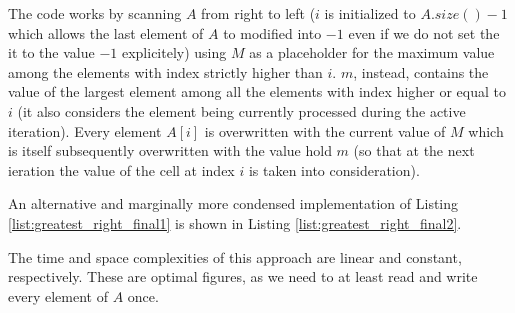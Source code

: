 

The code works by scanning $A$ from right to left ($i$ is initialized to $A.size()-1$ which allows the last element of $A$ to modified into $-1$ even if we do not set the it to the value $-1$ explicitely) using $M$ as a placeholder for the maximum value among the elements with index strictly higher than $i$. 
$m$, instead, contains the value of the largest element among all the elements with index higher or equal to $i$ (it also considers the element being currently processed during the active iteration). 
Every element $A[i]$ is overwritten with the current value of $M$ which is itself subsequently overwritten with the value hold $m$ (so that at the next ieration the value of the cell at index $i$ is taken into consideration).

An alternative and marginally more condensed implementation of Listing \ref{list:greatest_right_final1} is shown in Listing \ref{list:greatest_right_final2}.



The time and space complexities of this approach are linear and constant, respectively. These are optimal figures, as we need to at least read and write every element of $A$ once. 